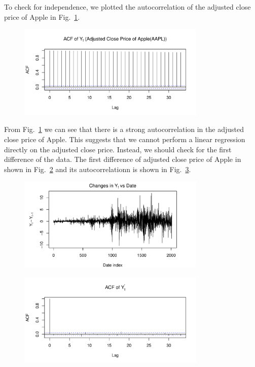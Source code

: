 \documentclass[conference,onecolumn,11pt]{IEEEtran}
\begin{document}
To check for independence, we plotted the autocorrelation of the adjusted close price of Apple in Fig.~\ref{fig:acf1}.

\begin{figure}[htpb]
	\centering
	\includegraphics[width=0.8\textwidth]{pic/ACF_AdjClosed.pdf}
	\caption{}
	\label{fig:acf1}
\end{figure}

From Fig.~\ref{fig:acf1} we can see that there is a strong autocorrelation in the adjusted close price of Apple. This suggests that we cannot perform a linear regression directly on the adjusted close price. Instead, we should check for the first difference of the data. The first difference of adjusted close price of Apple in shown in Fig.~\ref{fig:d} and its autocorrelationn is shown in Fig.~\ref{fig:acf2}.

\begin{figure}[htpb]
	\centering
	\includegraphics[width=0.8\textwidth]{pic/AdjClosed.pdf}
	\caption{}
	\label{fig:d}
\end{figure}

\begin{figure}[htpb]
	\centering
	\includegraphics[width=0.8\textwidth]{pic/ACF_dAdjClosed.pdf}
	\caption{}
	\label{fig:acf2}
\end{figure}
\end{document}
